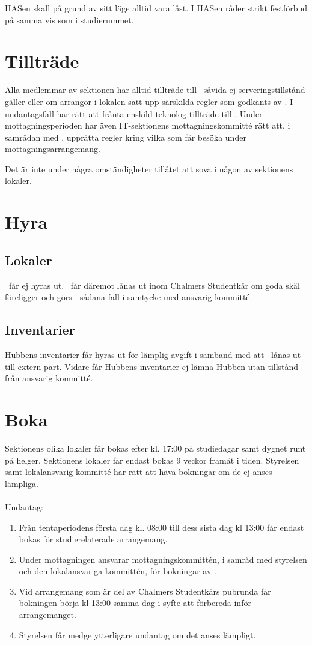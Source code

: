 \documentclass[11pt, includeaddress]{classes/cthit}
\begin{document}
HASen skall på grund av sitt läge alltid vara låst. I HASen råder strikt festförbud på samma vis som i studierummet.

\section{Tillträde}
Alla medlemmar av sektionen har alltid tillträde till \HUBBEN\ såvida ej serveringstillstånd gäller eller
om arrangör i lokalen satt upp särskilda regler som godkänts av \STYRIT. I undantagsfall har \STYRIT{} rätt
att frånta enskild teknolog tillträde till \HUBBEN{}. Under mottagningsperioden har även IT-sektionens mottagningskommitté rätt att, i samrådan med \STYRIT{}, upprätta regler kring vilka som får besöka \HUBBEN{} under mottagningsarrangemang.


Det är inte under några omständigheter tillåtet att sova i någon av sektionens lokaler.


\section{Hyra}
\subsection{Lokaler}
\HUBBEN\ får ej hyras ut. \HUBBEN\ får däremot lånas ut inom Chalmers Studentkår om goda skäl
föreligger och görs i sådana fall i samtycke med ansvarig kommitté.

\subsection{Inventarier}
Hubbens inventarier får hyras ut för lämplig avgift i samband med att \HUBBEN\ lånas ut till extern part.
Vidare får Hubbens inventarier ej lämna Hubben utan tillstånd från ansvarig kommitté.


\section{Boka}
Sektionens olika lokaler får bokas efter kl. 17:00 på studiedagar samt dygnet runt på helger. Sektionens lokaler får endast bokas 9 veckor framåt i tiden. Styrelsen samt lokalansvarig kommitté har rätt att häva bokningar om de ej anses lämpliga.\\\\
Undantag: 
\begin{enumerate}
    \item Från tentaperiodens första dag kl. 08:00 till dess sista dag kl 13:00 får \HUBBEN{} endast bokas för studierelaterade arrangemang.
    \item Under mottagningen ansvarar mottagningskommittén, i samråd med styrelsen och den lokalansvariga kommittén, för bokningar av \HUBBEN{}.
    \item Vid arrangemang som är del av Chalmers Studentkårs pubrunda får bokningen börja kl 13:00 samma dag i syfte att förbereda inför arrangemanget.
    \item Styrelsen får medge ytterligare undantag om det anses lämpligt.
\end{enumerate}
\end{document}
